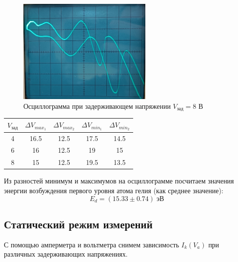     \begin{figure}[H]
        \centering
        \includegraphics[width=0.59\textwidth]{images/V_th_8_1.jpg}
        \caption{Осциллограмма при задерживающем напряжении $V_{\text{зад}} = 8$ В}
        \label{fig:vth8}
    \end{figure}

    \begin{table}[H]
        \centering
        \begin{tabular}{|c|c|c|c|c|}
            \hline
            $V_{\text{зад}}$ & $\Delta V_{max_1}$ & $\Delta V_{max_2}$ & $\Delta V_{min_1}$ & $\Delta V_{min_2}$ \\ \hline
            4                & 16.5               & 12.5               & 17.5               & 14.5               \\ \hline
            6                & 16                 & 12.5               & 19                 & 15                 \\ \hline
            8                & 15                 & 12.5               & 19.5               & 13.5               \\ \hline
        \end{tabular}
    \end{table}

    Из разностей минимум и максимумов на осциллограмме посчитаем значения энергии возбуждения первого уровня атома гелия (как среднее значение):
    \begin{equation}
        E_d = (15.33 \pm 0.74) \; \text{эВ}
    \end{equation}

\subsection{Статический режим измерений}

    С помощью амперметра и вольтметра снимем зависимость $I_k(V_a)$ при различных задерживающих напряжениях.

